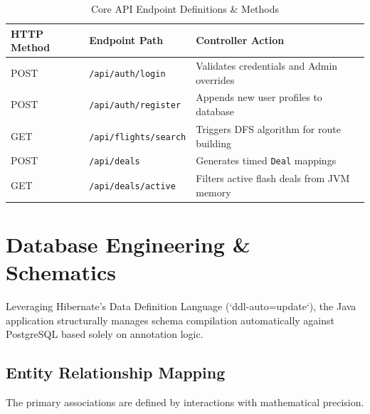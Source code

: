 \documentclass[12pt,a4paper]{article}
\begin{document}
\begin{table}[htbp]
    \centering
    \caption{Core API Endpoint Definitions \& Methods}
    \vspace{0.3cm}
    \renewcommand{\arraystretch}{1.5}
    \begin{tabular}{|p{2.5cm}|p{5cm}|p{7cm}|}
        \hline
        \textbf{HTTP Method} & \textbf{Endpoint Path} & \textbf{Controller Action} \\
        \hline
        POST & \texttt{/api/auth/login} & Validates credentials and Admin overrides \\
        POST & \texttt{/api/auth/register} & Appends new user profiles to database \\
        GET & \texttt{/api/flights/search} & Triggers DFS algorithm for route building \\
        POST & \texttt{/api/deals} & Generates timed \texttt{Deal} mappings \\
        GET & \texttt{/api/deals/active} & Filters active flash deals from JVM memory \\
        \hline
    \end{tabular}
    \label{tab:api_endpoints}
\end{table}

\newpage

\section{Database Engineering \& Schematics}

Leveraging Hibernate's Data Definition Language (`ddl-auto=update`), the Java application structurally manages schema compilation automatically against PostgreSQL based solely on annotation logic. 

\subsection{Entity Relationship Mapping}
The primary associations are defined by interactions with mathematical precision. 
\end{document}
